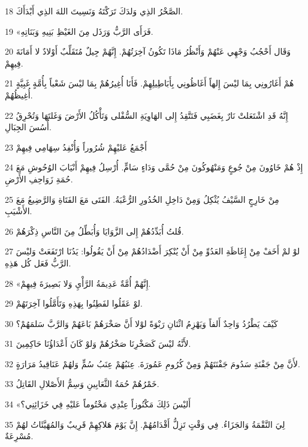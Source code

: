 \par 18 الصَّخْرُ الذِي وَلدَكَ تَرَكْتَهُ وَنَسِيتَ اللهَ الذِي أَبْدَأَكَ.
\par 19 «فَرَأَى الرَّبُّ وَرَذَل مِنَ الغَيْظِ بَنِيهِ وَبَنَاتِهِ.
\par 20 وَقَال أَحْجُبُ وَجْهِي عَنْهُمْ وَأَنْظُرُ مَاذَا تَكُونُ آخِرَتُهُمْ. إِنَّهُمْ جِيلٌ مُتَقَلِّبٌ أَوْلادٌ لا أَمَانَةَ فِيهِمْ.
\par 21 هُمْ أَغَارُونِي بِمَا ليْسَ إِلهاً أَغَاظُونِي بِأَبَاطِيلِهِمْ. فَأَنَا أُغِيرُهُمْ بِمَا ليْسَ شَعْباً بِأُمَّةٍ غَبِيَّةٍ أُغِيظُهُمْ.
\par 22 إِنَّهُ قَدِ اشْتَعَلتْ نَارٌ بِغَضَبِي فَتَتَّقِدُ إِلى الهَاوِيَةِ السُّفْلى وَتَأْكُلُ الأَرْضَ وَغَلتَهَا وَتُحْرِقُ أُسُسَ الجِبَالِ.
\par 23 أَجْمَعُ عَليْهِمْ شُرُوراً وَأُنْفِدُ سِهَامِي فِيهِمْ
\par 24 إِذْ هُمْ خَاوُونَ مِنْ جُوعٍ وَمَنْهُوكُونَ مِنْ حُمَّى وَدَاءٍ سَامٍّ. أُرْسِلُ فِيهِمْ أَنْيَابَ الوُحُوشِ مَعَ حُمَةِ زَوَاحِفِ الأَرْضِ.
\par 25 مِنْ خَارِجٍ السَّيْفُ يُثْكِلُ وَمِنْ دَاخِلِ الخُدُورِ الرُّعْبَةُ. الفَتَى مَعَ الفَتَاةِ وَالرَّضِيعُ مَعَ الأَشْيَبِ.
\par 26 قُلتُ أُبَدِّدُهُمْ إِلى الزَّوَايَا وَأُبَطِّلُ مِنَ النَّاسِ ذِكْرَهُمْ.
\par 27 لوْ لمْ أَخَفْ مِنْ إِغَاظَةِ العَدُوِّ مِنْ أَنْ يُنْكِرَ أَضْدَادُهُمْ مِنْ أَنْ يَقُولُوا: يَدُنَا ارْتَفَعَتْ وَليْسَ الرَّبُّ فَعَل كُل هَذِهِ.
\par 28 «إِنَّهُمْ أُمَّةٌ عَدِيمَةُ الرَّأْيِ وَلا بَصِيرَةَ فِيهِمْ.
\par 29 لوْ عَقَلُوا لفَطِنُوا بِهَذِهِ وَتَأَمَّلُوا آخِرَتَهُمْ.
\par 30 كَيْفَ يَطْرُدُ وَاحِدٌ أَلفاً وَيَهْزِمُ اثْنَانِ رَبْوَةً لوْلا أَنَّ صَخْرَهُمْ بَاعَهُمْ وَالرَّبَّ سَلمَهُمْ؟
\par 31 لأَنَّهُ ليْسَ كَصَخْرِنَا صَخْرُهُمْ وَلوْ كَانَ أَعْدَاؤُنَا حَاكِمِينَ.
\par 32 لأَنَّ مِنْ جَفْنَةِ سَدُومَ جَفْنَتَهُمْ وَمِنْ كُرُومِ عَمُورَةَ. عِنَبُهُمْ عِنَبُ سُمٍّ وَلهُمْ عَنَاقِيدُ مَرَارَةٍ.
\par 33 خَمْرُهُمْ حُمَةُ الثَّعَابِينِ وَسِمُّ الأَصْلالِ القَاتِلُ.
\par 34 «أَليْسَ ذَلِكَ مَكْنُوزاً عِنْدِي مَخْتُوماً عَليْهِ فِي خَزَائِنِي؟
\par 35 لِيَ النَّقْمَةُ وَالجَزَاءُ. فِي وَقْتٍ تَزِلُّ أَقْدَامُهُمْ. إِنَّ يَوْمَ هَلاكِهِمْ قَرِيبٌ وَالمُهَيَّئَاتُ لهُمْ مُسْرِعَةٌ.

